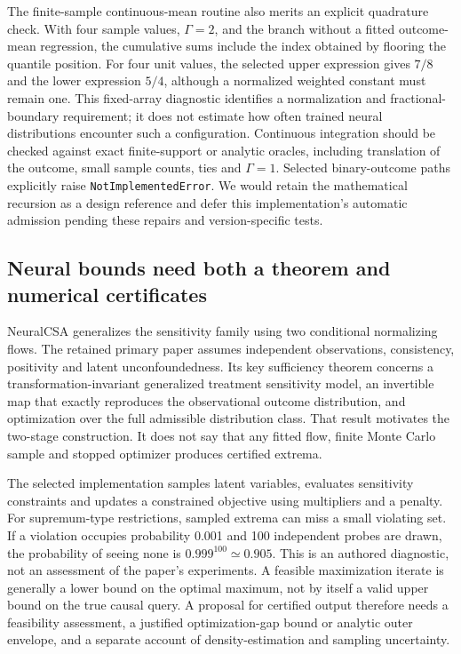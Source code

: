 The finite-sample continuous-mean routine also merits an explicit quadrature check. With four sample values, $\Gamma=2$, and the branch without a fitted outcome-mean regression, the cumulative sums include the index obtained by flooring the quantile position. For four unit values, the selected upper expression gives $7/8$ and the lower expression $5/4$, although a normalized weighted constant must remain one. This fixed-array diagnostic identifies a normalization and fractional-boundary requirement; it does not estimate how often trained neural distributions encounter such a configuration. Continuous integration should be checked against exact finite-support or analytic oracles, including translation of the outcome, small sample counts, ties and $\Gamma=1$. Selected binary-outcome paths explicitly raise \texttt{NotImplementedError}. We would retain the mathematical recursion as a design reference and defer this implementation's automatic admission pending these repairs and version-specific tests. \cite{exec25_pymed_sharp,exec25_pymed_choice}

\subsection{Neural bounds need both a theorem and numerical certificates}
NeuralCSA generalizes the sensitivity family using two conditional normalizing flows. The retained primary paper assumes independent observations, consistency, positivity and latent unconfoundedness. Its key sufficiency theorem concerns a transformation-invariant generalized treatment sensitivity model, an invertible map that exactly reproduces the observational outcome distribution, and optimization over the full admissible distribution class. That result motivates the two-stage construction. It does not say that any fitted flow, finite Monte Carlo sample and stopped optimizer produces certified extrema. \cite{exec25_pymed_neural_paper}

The selected implementation samples latent variables, evaluates sensitivity constraints and updates a constrained objective using multipliers and a penalty. For supremum-type restrictions, sampled extrema can miss a small violating set. If a violation occupies probability 0.001 and 100 independent probes are drawn, the probability of seeing none is $0.999^{100}\simeq0.905$. This is an authored diagnostic, not an assessment of the paper's experiments. A feasible maximization iterate is generally a lower bound on the optimal maximum, not by itself a valid upper bound on the true causal query. A proposal for certified output therefore needs a feasibility assessment, a justified optimization-gap bound or analytic outer envelope, and a separate account of density-estimation and sampling uncertainty. \cite{exec25_pymed_neuralcsa,exec25_pymed_neural_paper,exec25_pymed_choice}

